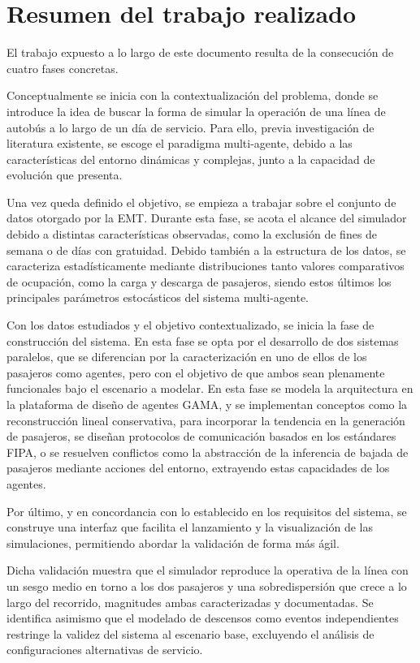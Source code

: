\section{Resumen del trabajo realizado}
El trabajo expuesto a lo largo de este documento resulta de la consecución de cuatro fases concretas.

Conceptualmente se inicia con la contextualización del problema, donde se introduce la idea de buscar la forma de simular
la operación de una línea de autobús a lo largo de un día de servicio. Para ello, previa investigación de literatura existente,
se escoge el paradigma multi-agente, debido a las características del entorno dinámicas y complejas, junto a la capacidad de evolución
que presenta.

Una vez queda definido el objetivo, se empieza a trabajar sobre el conjunto de datos otorgado por la EMT. Durante esta fase, se acota
el alcance del simulador debido a distintas características observadas, como la exclusión de fines de semana o de días con gratuidad.
Debido también a la estructura de los datos, se caracteriza estadísticamente mediante distribuciones tanto valores comparativos 
de ocupación, como la carga y descarga de pasajeros, siendo estos últimos los principales parámetros estocásticos del sistema multi-agente.

Con los datos estudiados y el objetivo contextualizado, se inicia la fase de construcción del sistema. En esta fase se opta por el
desarrollo de dos sistemas paralelos, que se diferencian por la caracterización en uno de ellos de los pasajeros como agentes, pero
con el objetivo de que ambos sean plenamente funcionales bajo el escenario a modelar. En esta fase se modela la arquitectura
en la plataforma de diseño de agentes GAMA, y se implementan conceptos como la reconstrucción lineal conservativa, para incorporar
la tendencia en la generación de pasajeros, se diseñan protocolos de comunicación basados en los estándares FIPA, 
o se resuelven conflictos como la abstracción de la inferencia de bajada de pasajeros mediante acciones del entorno, extrayendo
estas capacidades de los agentes.

Por último, y en concordancia con lo establecido en los requisitos del sistema, se construye
una interfaz que facilita el lanzamiento y la visualización de las simulaciones, permitiendo
abordar la validación de forma más ágil.

Dicha validación muestra que el simulador reproduce la operativa de la línea con un sesgo
medio en torno a los dos pasajeros y una sobredispersión que crece a lo largo del recorrido,
magnitudes ambas caracterizadas y documentadas. Se identifica asimismo que el modelado de
descensos como eventos independientes restringe la validez del sistema al escenario base,
excluyendo el análisis de configuraciones alternativas de servicio.

